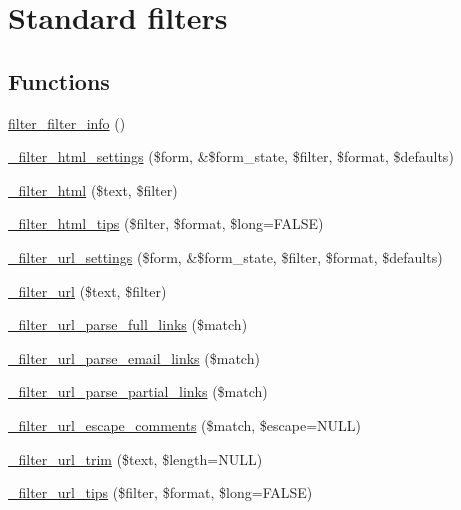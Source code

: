 \hypertarget{group__standard__filters}{
\section{Standard filters}
\label{group__standard__filters}
}
\subsection*{Functions}
\begin{DoxyCompactItemize}
\item 
\hyperlink{group__standard__filters_ga38089b90576e648c56228ee99c9c1767}{filter\_\-filter\_\-info} ()
\item 
\hyperlink{group__standard__filters_ga5e2c3faf03f281dc4ad7a4da6591fc3b}{\_\-filter\_\-html\_\-settings} (\$form, \&\$form\_\-state, \$filter, \$format, \$defaults)
\item 
\hyperlink{group__standard__filters_gaf366f72c1453f7295de4049269067a40}{\_\-filter\_\-html} (\$text, \$filter)
\item 
\hyperlink{group__standard__filters_gae86fb7b9514b6c41202c2e2479074b3b}{\_\-filter\_\-html\_\-tips} (\$filter, \$format, \$long=FALSE)
\item 
\hyperlink{group__standard__filters_ga6e9a9c137838e2ab2b0f6f2623bed95f}{\_\-filter\_\-url\_\-settings} (\$form, \&\$form\_\-state, \$filter, \$format, \$defaults)
\item 
\hyperlink{group__standard__filters_ga3014977a8aa365044b11f94abf04f313}{\_\-filter\_\-url} (\$text, \$filter)
\item 
\hyperlink{group__standard__filters_ga68b2f3e518a53457b06137c5a7525f3c}{\_\-filter\_\-url\_\-parse\_\-full\_\-links} (\$match)
\item 
\hyperlink{group__standard__filters_gae2d1ce14d2a727aba3aa5637513ec7d0}{\_\-filter\_\-url\_\-parse\_\-email\_\-links} (\$match)
\item 
\hyperlink{group__standard__filters_ga37765388ac6d3986ed00dcbfc41d330f}{\_\-filter\_\-url\_\-parse\_\-partial\_\-links} (\$match)
\item 
\hyperlink{group__standard__filters_ga3812d3d44a81e993385890149dc186be}{\_\-filter\_\-url\_\-escape\_\-comments} (\$match, \$escape=NULL)
\item 
\hyperlink{group__standard__filters_gae320ec54b6c197f3263c2d54a4477e55}{\_\-filter\_\-url\_\-trim} (\$text, \$length=NULL)
\item 
\hyperlink{group__standard__filters_ga7f7a390abfeefdfc03ad377037edfb18}{\_\-filter\_\-url\_\-tips} (\$filter, \$format, \$long=FALSE)

\end{DoxyCompactItemize}
